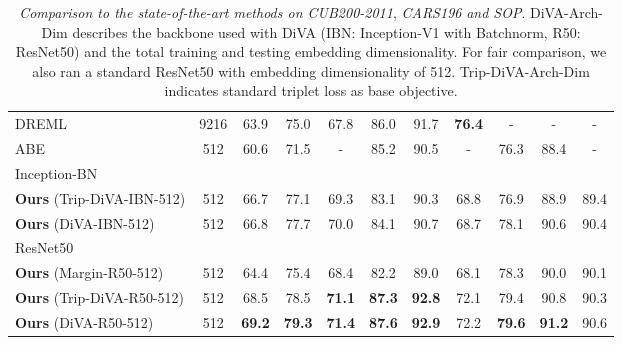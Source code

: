 \documentclass[runningheads]{llncs}
\begin{document}
\begin{table*}[t]
\begin{tabular}{l|c|cc|c||cc|c||cc|c}
        DREML\cite{dreml}     & 9216 & 63.9 & 75.0 & 67.8 & 86.0 & 91.7 & \textbf{76.4} & -    & -    & -\\
        ABE\cite{abe}         & 512  & 60.6 & 71.5 & -    & 85.2 & 90.5 & -    & 76.3 & 88.4 & -\\
        \hline
        \multicolumn{11}{l}{Inception-BN} \\           
        \hline
        \textbf{Ours} (Trip-DiVA-IBN-512)   & 512  & 66.7 & 77.1 & 69.3 & 83.1 & 90.3 & 68.8 & 76.9 & 88.9 & 89.4\\            
        \textbf{Ours} (DiVA-IBN-512)    & 512  & 66.8 & 77.7 & 70.0 & 84.1 & 90.7 & 68.7 & 78.1 & 90.6 & 90.4\\ 
\hline
        \multicolumn{11}{l}{ResNet50} \\           
        \hline
        \textbf{Ours} (Margin\cite{margin}-R50-512) & 512 & 64.4 & 75.4 & 68.4 & 82.2 & 89.0 & 68.1 & 78.3 & 90.0 & 90.1\\ 
        \textbf{Ours} (Trip-DiVA-R50-512) & 512 & 68.5 & 78.5 & \textbf{71.1} & \textbf{87.3} & \textbf{92.8} & 72.1 & 79.4 & 90.8 & 90.3\\         
        \textbf{Ours} (DiVA-R50-512) & 512 & \textbf{69.2} & \textbf{79.3} & \textbf{71.4} & \textbf{87.6} & \textbf{92.9} & 72.2 & \textbf{79.6} & \textbf{91.2} & 90.6\\ 
        \bottomrule
    \end{tabular}
    \caption{\textit{Comparison to the state-of-the-art methods on CUB200-2011}\cite{cub200-2011}, \textit{CARS196}\cite{cars196} \textit{and SOP}\cite{lifted}. DiVA-Arch-Dim describes the backbone used with DiVA (IBN: Inception-V1 with Batchnorm, R50: ResNet50) and the total training and testing embedding dimensionality. For fair comparison, we also ran a standard ResNet50 with embedding dimensionality of 512. Trip-DiVA-Arch-Dim indicates standard triplet loss as base objective. 
}
    \vspace*{-1cm}
    \label{tab:sota}
\end{table*}










%
 
\end{document}
